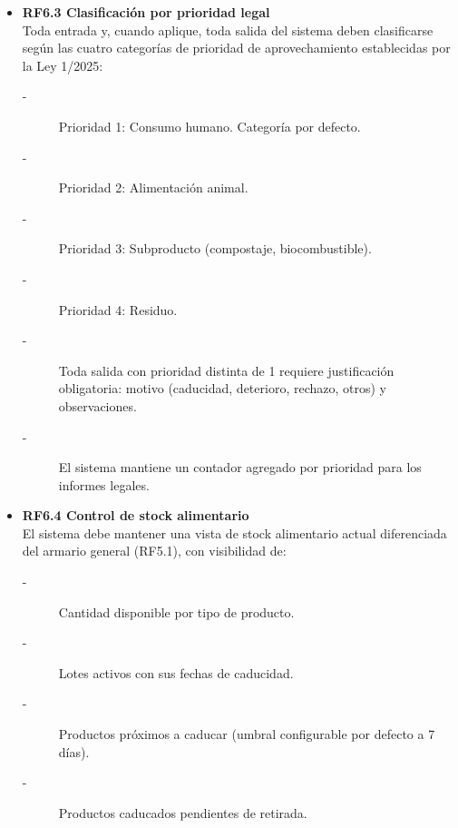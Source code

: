 \begin{itemize}
    \item \textbf{RF6.3 Clasificación por prioridad legal} \\
    Toda entrada y, cuando aplique, toda salida del sistema deben
    clasificarse según las cuatro categorías de prioridad de aprovechamiento
    establecidas por la Ley 1/2025:
    \begin{description}
        \item[-] Prioridad 1: Consumo humano. Categoría por defecto.
        \item[-] Prioridad 2: Alimentación animal.
        \item[-] Prioridad 3: Subproducto (compostaje, biocombustible).
        \item[-] Prioridad 4: Residuo.
        \item[-] Toda salida con prioridad distinta de 1 requiere justificación
        obligatoria: motivo (caducidad, deterioro, rechazo, otros) y
        observaciones.
        \item[-] El sistema mantiene un contador agregado por prioridad para los informes legales.
    \end{description}

    \item \textbf{RF6.4 Control de stock alimentario} \\
    El sistema debe mantener una vista de stock alimentario actual
    diferenciada del armario general (RF5.1), con visibilidad de:
    \begin{description}
        \item[-] Cantidad disponible por tipo de producto.
        \item[-] Lotes activos con sus fechas de caducidad.
        \item[-] Productos próximos a caducar (umbral configurable por defecto a 7 días).
        \item[-] Productos caducados pendientes de retirada.
    \end{description}



\end{itemize}
